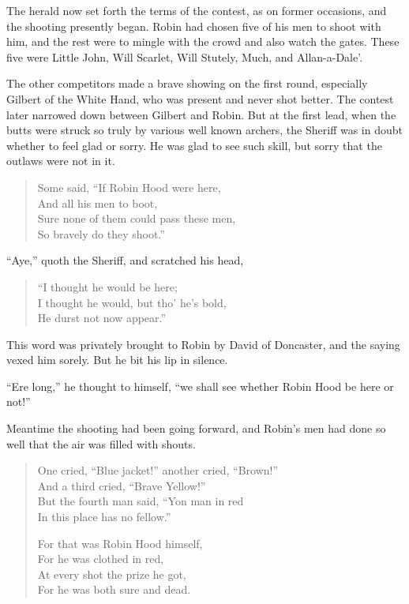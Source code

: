 The herald now set forth the terms of the contest, as on former
occasions, and the shooting presently began. Robin had chosen five of
his men to shoot with him, and the rest were to mingle with the crowd
and also watch the gates. These five were Little John, Will Scarlet,
Will Stutely, Much, and Allan-a-Dale'.

The other competitors made a brave showing on the first round,
especially Gilbert of the White Hand, who was present and never shot
better. The contest later narrowed down between Gilbert and Robin. But
at the first lead, when the butts were struck so truly by various well
known archers, the Sheriff was in doubt whether to feel glad or sorry.
He was glad to see such skill, but sorry that the outlaws were not in
it.

\begin{quote}
Some said, “If Robin Hood were here,\\
And all his men to boot,\\
Sure none of them could pass these men,\\
So bravely do they shoot.”
\end{quote}

``Aye,'' quoth the Sheriff, and scratched his head,

\begin{quote}
“I thought he would be here;\\
I thought he would, but tho’ he’s bold,\\
He durst not now appear.”
\end{quote}

This word was privately brought to Robin by David of Doncaster, and the
saying vexed him sorely. But he bit his lip in silence.

``Ere long,'' he thought to himself, ``we shall see whether Robin Hood
be here or not!''

Meantime the shooting had been going forward, and Robin's men had done
so well that the air was filled with shouts.

\begin{quote}
One cried, “Blue jacket!” another cried, “Brown!”\\
And a third cried, “Brave Yellow!”\\
But the fourth man said, “Yon man in red\\
In this place has no fellow.”

For that was Robin Hood himself,\\
For he was clothed in red,\\
At every shot the prize he got,\\
For he was both sure and dead.
\end{quote}

